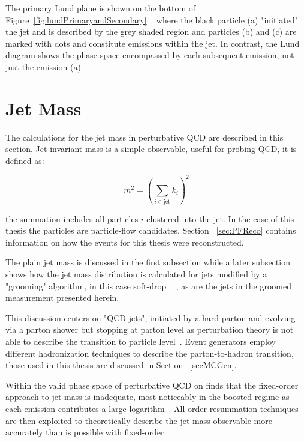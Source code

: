 The primary Lund plane is shown on the bottom of Figure~\ref{fig:lundPrimaryandSecondary} ~\cite{Dreyer:2018nbf} where the black particle (a) "initiated" the jet and is described by the grey shaded region and particles (b) and (c) are marked with dots and constitute emissions within the jet. In contrast, the Lund diagram shows the phase space encompassed by each subsequent emission, not just the emission (a).~\cite{Dreyer:2018nbf}






\section{Jet Mass}\label{sec:jetmass}


The calculations for the jet mass in perturbative QCD are described in this section. Jet invariant mass is a simple observable, useful for probing QCD, it is defined as:\newline

\begin{equation}
m^{2}=\left(\sum_{i \in \mathrm{jet}} k_{i}\right)^{2}
\end{equation}

the summation includes all particles $i$ clustered into the jet. In the case of this thesis the particles are particle-flow candidates, Section ~\ref{sec:PFReco} contains information on how the events for this thesis were reconstructed.

The plain jet mass is discussed in the first subsection while a later subsection shows how the jet mass distribution is calculated for jets modified by a "grooming" algorithm, in this case soft-drop ~\cite{softdrop} , as are the jets in the groomed measurement presented herein.

This discussion centers on "QCD jets", initiated by a hard parton and evolving via a parton shower but stopping at parton level as perturbation theory is not able to describe the transition to particle level~\cite{Marzani:2019hun}. Event generators employ different hadronization techniques to describe the parton-to-hadron transition, those used in this thesis are discussed in Section ~\ref{secMCGen}.

Within the valid phase space of perturbative QCD on finds that the fixed-order approach to jet mass is inadequate, most noticeably in the boosted regime as each emission contributes a large logarithm~\cite{Marzani:2019hun}. All-order resummation techniques are then exploited to theoretically describe the jet mass observable more accurately than is possible with fixed-order. 




